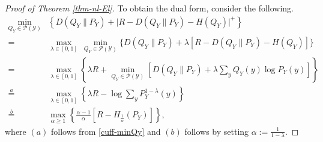 \documentclass[10pt,a4paper]{amsart}
\newcommand{\mP}{\mathcal{P}}
\newcommand{\mY}{\mathcal{Y}}
\begin{document}
\begin{proof}[Proof of Theorem \ref{thm-nl-El}]
To obtain the dual form, consider the following.
\begin{align*}
    \min_{Q_Y\in\mP(\mY)} &
        \left\{ D(Q_Y\|P_Y) + \big| R - D(Q_Y\|P_Y) - H(Q_Y) \big|^+ \right\} \\
    = \ & \max_{\lambda\in[0,1]} \ \min_{Q_Y\in\mP(\mY)} 
        \big\{ D(Q_Y\|P_Y) + \lambda\left[ R - D(Q_Y\|P_Y) - H(Q_Y) \right] \big\} \\
    = \ & \max_{\lambda\in[0,1]} \left\{\lambda R + \min_{Q_Y\in\mP(\mY)}
        \left[ D(Q_Y\|P_Y) + \lambda \sum_y Q_Y(y) \log P_Y(y) \right] \right\} \\
    \overset{a}{=} \ & \max_{\lambda\in[0,1]}
        \left\{ \lambda R - \log \sum_y P_Y^{1-\lambda}(y) \right\} \\
    \overset{b}{=} \ & \max_{\alpha\geq1} \left\{ \frac{\alpha-1}{\alpha} \left[R - H_{\frac{1}{\alpha}}(P_Y)\right] \right\},
\end{align*}
where $(a)$ follows from \eqref{cuff-minQy} and $(b)$ follows by setting $\alpha:= \frac{1}{1-\lambda}$.
\end{proof}
\end{document}
